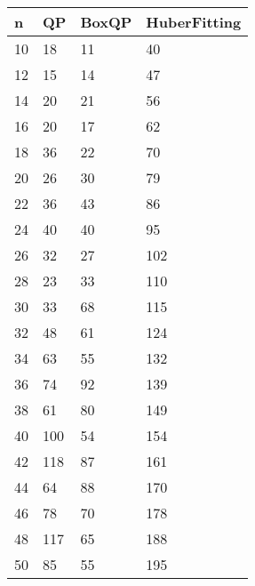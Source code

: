 \begin{tabular}{llll}
n & QP & BoxQP & HuberFitting \\ 
\hline 
10 & 18 & 11 & 40 \\ 
12 & 15 & 14 & 47 \\ 
14 & 20 & 21 & 56 \\ 
16 & 20 & 17 & 62 \\ 
18 & 36 & 22 & 70 \\ 
20 & 26 & 30 & 79 \\ 
22 & 36 & 43 & 86 \\ 
24 & 40 & 40 & 95 \\ 
26 & 32 & 27 & 102 \\ 
28 & 23 & 33 & 110 \\ 
30 & 33 & 68 & 115 \\ 
32 & 48 & 61 & 124 \\ 
34 & 63 & 55 & 132 \\ 
36 & 74 & 92 & 139 \\ 
38 & 61 & 80 & 149 \\ 
40 & 100 & 54 & 154 \\ 
42 & 118 & 87 & 161 \\ 
44 & 64 & 88 & 170 \\ 
46 & 78 & 70 & 178 \\ 
48 & 117 & 65 & 188 \\ 
50 & 85 & 55 & 195 \\ 
\hline 
\end{tabular}